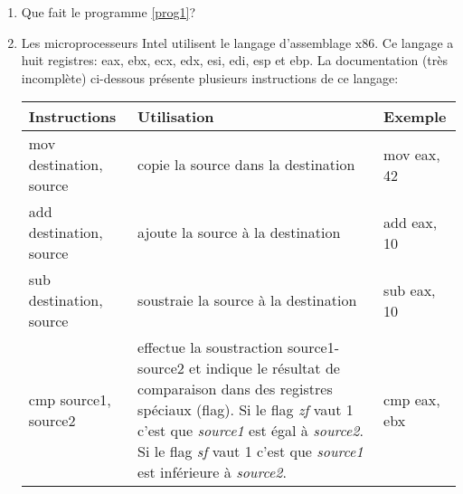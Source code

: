 \documentclass[a4paper,11pt]{article}
\begin{document}
\begin{exo}
    \begin{enumerate}
        \item Que fait le programme \ref{prog1}?
              
        \item Les microprocesseurs Intel utilisent le langage d'assemblage x86. Ce langage a huit registres: eax, ebx, ecx, edx, esi, edi, esp et ebp. La documentation (très incomplète) ci-dessous présente plusieurs instructions de ce langage:
              \begin{center}
                  \begin{tabular}{|*{3}{>{\centering\arraybackslash}m{}|}}
                      \hline
                      Instructions            & Utilisation                                                                                                                                                                                                                                                                              & Exemple      \\
                      \hline
                      mov destination, source & copie la source dans la destination                                                                                                                                                                                                                                                      & mov eax, 42  \\
                      \hline
                      add destination, source & ajoute la source à la destination                                                                                                                                                                                                                                                        & add eax, 10  \\
                      \hline
                      sub destination, source & soustraie la source à la destination                                                                                                                                                                                                                                                     & sub eax, 10  \\
                      \hline
                      cmp source1, source2    & effectue la soustraction source1-source2 et indique le résultat de comparaison dans des registres spéciaux (flag). Si le flag \emph{zf} vaut 1 c'est que \emph{source1} est égal à \emph{source2}. Si le flag \emph{sf} vaut 1 c'est que \emph{source1} est inférieure à \emph{source2}. & cmp eax, ebx \\

\end{tabular}
\end{center}
\end{enumerate}
\end{exo}
\end{document}
